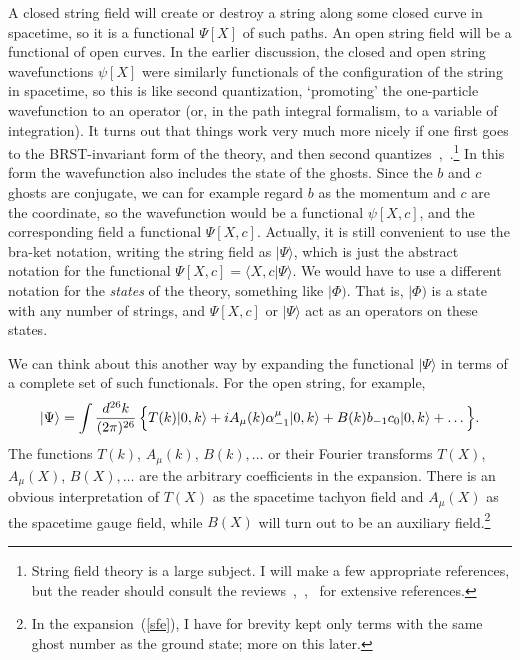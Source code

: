 
A closed string field will create or destroy a string along some
closed curve in spacetime, so it is a functional $\Psi[X]$ of such
paths.  An open string field will be a functional of open
curves.  In the earlier discussion, the closed and open string
wavefunctions $\psi[X]$ were similarly functionals of the
configuration of the string in spacetime, so this is like second
quantization, `promoting' the one-particle wavefunction to an operator
(or, in the path integral formalism, to a variable of integration).
It turns out that things work very much more nicely if one first goes
to the BRST-invariant form of the theory, and then second
quantizes~\cite{Sbrst},~\cite{Wsft}.\footnote
{String field theory is a large subject.  I will make a few
appropriate references, but the reader should consult the
reviews~\cite{Tsft},~\cite{Ssft},~\cite{Zsft} for extensive
references.} In this form the wavefunction also includes the state
of the ghosts. Since the $b$ and $c$ ghosts are conjugate, we can
for example regard
$b$ as the momentum and $c$ are the coordinate, so the wavefunction
would be a functional $\psi[X,c]$, and the corresponding field a
functional $\Psi[X,c]$.  Actually, it is still convenient to use the
bra-ket notation, writing the string field as $| \Psi \rangle$, which
is just the abstract notation for the functional $\Psi[X,c]
= \langle X,c | \Psi \rangle$.
We would have to use a different notation for the {\it states}
of the theory, something like {\boldmath $| \Phi )$}.
That is, {\boldmath $| \Phi )$}
is a state with any number of
strings, and $\Psi[X,c]$ or $| \Psi \rangle$ act as an operators on
these states.

We can think about this another way by expanding the functional
$| \Psi \rangle$ in terms of a complete set of such functionals.  For
the open string, for example,
\begin{equation}
| \Psi \rangle = \int \frac{d^{26}k}{(2\pi)^{26}}\,
\Bigl\{ T(k) |0,k\rangle + i A_\mu(k) \alpha_{-1}^\mu |0,k\rangle
+ B(k) b_{-1} c_0 |0,k\rangle + \ldots \, \Bigr\}. \label{sfe}
\end{equation}
The functions $T(k)$, $A_\mu(k)$, $B(k),\ldots$ or their
Fourier transforms $T(X)$, $A_\mu(X)$, $B(X),\ldots$ are the arbitrary
coefficients in the expansion.  There is an obvious interpretation of
$T(X)$ as the spacetime tachyon field and $A_\mu(X)$ as the
spacetime gauge field, while $B(X)$ will turn out to be an auxiliary
field.\footnote
{In the expansion~(\ref{sfe}), I have for brevity kept only terms
with the same ghost number as the ground state; more on this later.}

